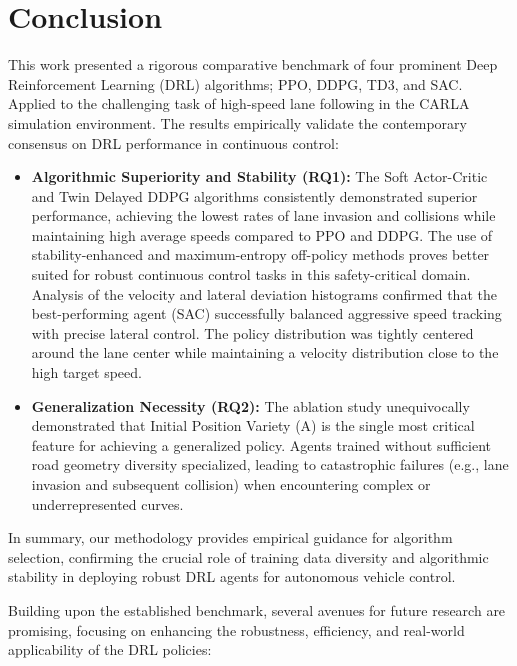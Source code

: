 \documentclass[]{interact}
\begin{document}
\section{Conclusion}
\label{sec:conclusion}

This work presented a rigorous comparative benchmark of four prominent Deep Reinforcement Learning (DRL) algorithms; PPO, DDPG, TD3, and SAC. Applied to the challenging task of high-speed lane following in the CARLA simulation environment. The results empirically validate the contemporary consensus on DRL performance in continuous control:

\begin{itemize}
    \item \textbf{Algorithmic Superiority and Stability (RQ1):} The Soft Actor-Critic  and Twin Delayed DDPG algorithms consistently demonstrated superior performance, achieving the lowest rates of lane invasion and collisions while maintaining high average speeds compared to PPO and DDPG. The use of stability-enhanced and maximum-entropy off-policy methods proves better suited for robust continuous control tasks in this safety-critical domain. Analysis of the velocity and lateral deviation histograms confirmed that the best-performing agent (SAC) successfully balanced aggressive speed tracking with precise lateral control. The policy distribution was tightly centered around the lane center while maintaining a velocity distribution close to the high target speed.
    \item \textbf{Generalization Necessity (RQ2):} The ablation study unequivocally demonstrated that Initial Position Variety (A) is the single most critical feature for achieving a generalized policy. Agents trained without sufficient road geometry diversity specialized, leading to catastrophic failures (e.g., lane invasion and subsequent collision) when encountering complex or underrepresented curves.
\end{itemize}

In summary, our methodology provides empirical guidance for algorithm selection, confirming the crucial role of training data diversity and algorithmic stability in deploying robust DRL agents for autonomous vehicle control.

Building upon the established benchmark, several avenues for future research are promising, focusing on enhancing the robustness, efficiency, and real-world applicability of the DRL policies:
\end{document}
